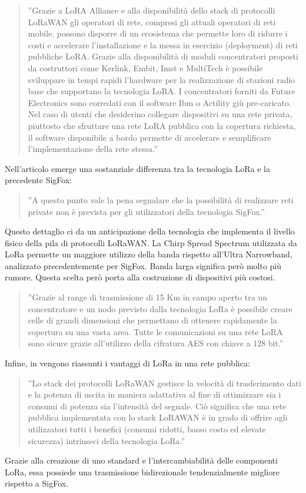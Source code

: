 \documentclass[a4paper]{report} %
\begin{document}
\begin{quote}	
	''Grazie a LoRA Alliance e alla disponibilità dello stack di protocolli LoRaWAN gli operatori di rete, compresi gli attuali operatori di reti mobile, possono disporre di un ecosistema che permette loro di ridurre i costi e accelerare l'installazione e la messa in esercizio (deployment) di reti pubbliche LoRA. Grazie alla disponibilità di moduli concentratori proposti da costruttori come Kerlink, Embit, Imst e MultiTech è possibile sviluppare in tempi rapidi l'hardware per la realizzazione di stazioni radio base che supportano la tecnologia LoRA. I concentratori forniti da Future Electronics sono corredati con il software Ibm o Actility giù pre-caricato. Nel caso di utenti che desiderino collegare dispositivi su una rete privata, piuttosto che sfruttare una rete LoRA pubblica con la copertura richiesta, il software disponibile a bordo permette di accelerare e semplificare l'implementazione della rete stessa.'' 
\end{quote}
Nell'articolo \cite{art:rif.23} emerge una sostanziale differenza tra la tecnologia LoRa e la precedente SigFox:
\begin{quote}	
	''A questo punto vale la pena segnalare che la possibilità di realizzare reti private non è prevista per gli utilizzatori della tecnologia SigFox.'' 
\end{quote}	
Questo dettaglio ci da un anticipazione della tecnologia che implementa il livello fisico della pila di protocolli LoRaWAN.
La Chirp Spread Spectrum utilizzata da LoRa permette un maggiore utilizzo della banda rispetto all'Ultra Narrowband, analizzato precedentemente per SigFox. Banda larga significa però molto più rumore. Questa scelta però porta alla costruzione di dispositivi più costosi.
\begin{quote}
	''Grazie al range di trasmissione di 15 Km in campo aperto tra un concentratore e un nodo previsto dalla tecnologia LoRa è possibile creare celle di grandi dimensioni che permettano di ottenere rapidamente la copertura su una vasta area. Tutte le comunicazioni su una rete LoRA sono sicure grazie all'utilizzo della cifratura AES con chiave a 128 bit.'' 
\end{quote}
Infine, in \cite{art:rif.23} vengono riassunti i vantaggi di LoRa in una rete pubblica:
\begin{quote}	
	''Lo stack dei protocolli LoRaWAN gestisce la velocità di trasferimento dati e la potenza di uscita in maniera adattativa al fine di ottimizzare sia i consumi di potenza sia l'intensità del segnale. Ciò significa che una rete pubblica implementata con lo stack LoRAWAN è in grado di offrire agli utilizzatori tutti i benefici (consumi ridotti, basso costo ed elevate sicurezza) intrinseci della tecnologia LoRa.''
\end{quote}
Grazie alla creazione di uno standard e l'intercambiabilità delle componenti LoRa, essa possiede una trasmissione bidirezionale tendenzialmente migliore rispetto a SigFox.
\end{document}
